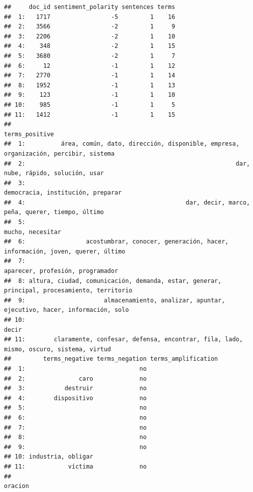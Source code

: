 \documentclass[
]{book}
\begin{document}
\begin{verbatim}
##     doc_id sentiment_polarity sentences terms
##  1:   1717                 -5         1    16
##  2:   3566                 -2         1     9
##  3:   2206                 -2         1    10
##  4:    348                 -2         1    15
##  5:   3680                 -2         1     7
##  6:     12                 -1         1    12
##  7:   2770                 -1         1    14
##  8:   1952                 -1         1    13
##  9:    123                 -1         1    10
## 10:    985                 -1         1     5
## 11:   1412                 -1         1    15
##                                                                                  terms_positive
##  1:          área, común, dato, dirección, disponible, empresa, organización, percibir, sistema
##  2:                                                           dar, nube, rápido, solución, usar
##  3:                                                           democracia, institución, preparar
##  4:                                             dar, decir, marco, peña, querer, tiempo, último
##  5:                                                                            mucho, necesitar
##  6:                 acostumbrar, conocer, generación, hacer, información, joven, querer, último
##  7:                                                            aparecer, profesión, programador
##  8: altura, ciudad, comunicación, demanda, estar, generar, principal, procesamiento, territorio
##  9:                      almacenamiento, analizar, apuntar, ejecutivo, hacer, información, solo
## 10:                                                                                       decir
## 11:        claramente, confesar, defensa, encontrar, fila, lado, mismo, oscuro, sistema, virtud
##         terms_negative terms_negation terms_amplification
##  1:                                no                    
##  2:               caro             no                    
##  3:           destruir             no                    
##  4:        dispositivo             no                    
##  5:                                no                    
##  6:                                no                    
##  7:                                no                    
##  8:                                no                    
##  9:                                no                    
## 10: industria, obligar                                   
## 11:            víctima             no                    
##                                                                                                                                                                                                        oracion

\end{verbatim}
\end{document}
